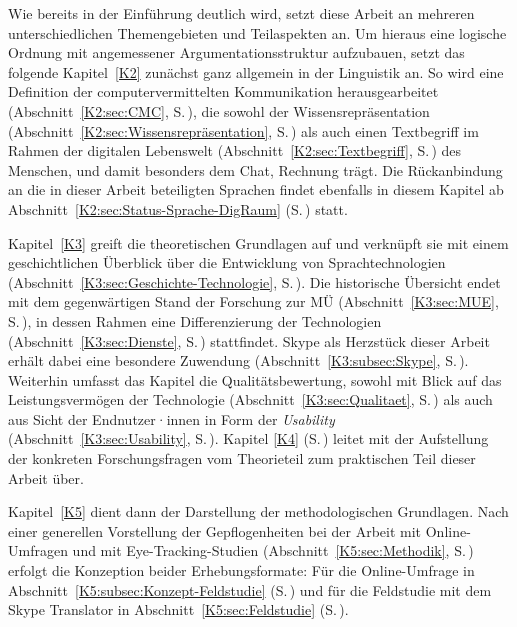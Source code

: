 
Wie bereits in der Einführung deutlich wird, setzt diese Arbeit an mehreren unterschiedlichen Themengebieten und Teilaspekten an. Um hieraus eine logische Ordnung mit angemessener Argumentationsstruktur aufzubauen, setzt das folgende Kapitel~\ref{K2} zunächst ganz allgemein in der Linguistik an. So wird eine Definition der computervermittelten Kommunikation herausgearbeitet (Abschnitt~\ref{K2:sec:CMC}, S.\,\pageref{K2:sec:CMC}), die sowohl der Wissensrepräsentation (Abschnitt~\ref{K2:sec:Wissensrepräsentation}, S.\,\pageref{K2:sec:Wissensrepräsentation}) als auch einen Textbegriff im Rahmen der digitalen Lebenswelt (Abschnitt~\ref{K2:sec:Textbegriff}, S.\,\pageref{K2:sec:Textbegriff}) des Menschen, und damit besonders dem Chat, Rechnung trägt. Die Rückanbindung an die in dieser Arbeit beteiligten Sprachen findet ebenfalls in diesem Kapitel ab Abschnitt~\ref{K2:sec:Status-Sprache-DigRaum} (S.\,\pageref{K2:sec:Status-Sprache-DigRaum}) statt.

Kapitel~\ref{K3} greift die theoretischen Grundlagen auf und verknüpft sie mit einem geschichtlichen Überblick über die Entwicklung von Sprachtechnologien (Abschnitt~\ref{K3:sec:Geschichte-Technologie}, S.\,\pageref{K3:sec:Geschichte-Technologie}). Die historische Übersicht endet mit dem gegenwärtigen Stand der Forschung zur MÜ (Abschnitt~\ref{K3:sec:MUE}, S.\,\pageref{K3:sec:MUE}), in dessen Rahmen eine Differenzierung der Technologien (Abschnitt~\ref{K3:sec:Dienste}, S.\,\pageref{K3:sec:Dienste}) stattfindet. Skype als Herzstück dieser Arbeit erhält dabei eine besondere Zuwendung (Abschnitt~\ref{K3:subsec:Skype}, S.\,\pageref{K3:subsec:Skype}). Weiterhin umfasst das Kapitel die Qualitätsbewertung, sowohl mit Blick auf das Leistungsvermögen der Technologie (Abschnitt~\ref{K3:sec:Qualitaet}, S.\,\pageref{K3:sec:Qualitaet}) als auch aus Sicht der Endnutzer·innen in Form der \emph{Usability} (Abschnitt~\ref{K3:sec:Usability}, S.\,\pageref{K3:sec:Usability}). Kapitel \ref{K4} (S.\,\pageref{K4}) leitet mit der Aufstellung der konkreten Forschungsfragen vom Theorieteil zum praktischen Teil dieser Arbeit über.

Kapitel~\ref{K5} dient dann der Darstellung der methodologischen Grundlagen. Nach einer generellen Vorstellung der Gepflogenheiten bei der Arbeit mit On\-line-Um\-fra\-gen und mit Eye-Tracking-Studien (Abschnitt~\ref{K5:sec:Methodik}, S.\,\pageref{K5:sec:Methodik}) erfolgt die Konzeption beider Erhebungsformate: Für die Online-Umfrage in Abschnitt~\ref{K5:subsec:Konzept-Feldstudie} (S.\,\pageref{K5:subsec:Konzept-Feldstudie}) und für die Feldstudie mit dem Skype Translator in Abschnitt~\ref{K5:sec:Feldstudie} (S.\,\pageref{K5:sec:Feldstudie}). 

